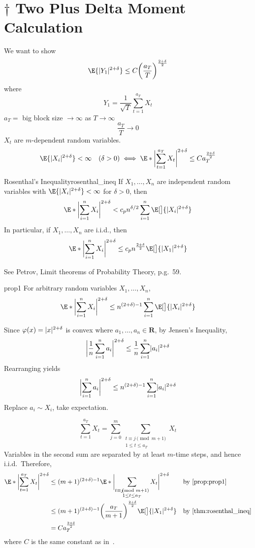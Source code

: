 \section{\texorpdfstring{$ \dagger $}{†} Two Plus Delta Moment Calculation}
We want to show
\[ \E{\abs{Y_1}^{2+\delta}}\le C\biggl(\frac{a_T}{T} \biggr)^{\frac{2+\delta}{2}} \]
where
\[ Y_1=\frac{1}{\sqrt{T}} \sum_{t=1}^{a_T} X_t \]
$ a_T= $ big block size $ \to\infty $ as $ T\to\infty $
\[ \frac{a_T}{T} \to 0 \]
$ X_t $ are $ m $-dependent random variables.
\[ \E{\abs{X_i}^{2+\delta}}<\infty\quad(\delta>0)\iff
    \E*{\abs[\bigg]{\sum_{t=1}^{a_T} X_t}^{2+\delta}}\le C a_T^{\frac{2+\delta}{2}} \]
\begin{Theorem}{Rosenthal's Inequality}{rosenthal_ineq}
    If $ X_1,\ldots,X_n $ are independent random variables
    with $ \E{\abs{X_i}^{2+\delta}}<\infty $ for $ \delta>0 $, then
    \[ \E*{\abs[\bigg]{\sum_{i=1}^{n} X_i}^{2+\delta}}<c_p n^{\delta/2}\sum_{i=1}^{n}
        \E[\big]{\abs{X_i}^{2+\delta}} \]
    In particular, if $ X_1,\ldots,X_n $ are i.i.d., then
    \[ \E*{\abs[\bigg]{\sum_{i=1}^{n} X_i}^{2+\delta}}\le c_p n^{\frac{2+\delta}{2}}
        \E[\big]{\abs{X_1}^{2+\delta}} \]
\end{Theorem}
\begin{Proof}{}{}
    See Petrov, Limit theorems of Probability Theory, p.g.\ 59.
\end{Proof}
\begin{Proposition}{}{prop1}
    For arbitrary random variables $ X_1,\ldots,X_n $,
    \[ \E*{\abs[\bigg]{\sum_{i=1}^{n} X_i}^{2+\delta}}\le n^{(2+\delta)-1}
        \sum_{i=1}^{n}\E[\big]{\abs{X_i}^{2+\delta}} \]
\end{Proposition}
\begin{Proof}{}{}
    Since $ \varphi(x)=\abs{x}^{2+\delta} $ is convex where $ a_1,\ldots,a_n\in\mathbf{R} $,
    by Jensen's Inequality,
    \[ \abs[\bigg]{\frac{1}{n} \sum_{i=1}^{n} a_i}^{2+\delta}\le \frac{1}{n} \sum_{i=1}^{n} \abs{a_i}^{2+\delta} \]
    Rearranging yields
    \[ \abs[\bigg]{\sum_{i=1}^{n} a_i}^{2+\delta}\le
        n^{(2+\delta)-1}\sum_{i=1}^{n} \abs{a_i}^{2+\delta} \]
    Replace $ a_i\sim X_i $, take expectation.
\end{Proof}
\[ \sum_{t=1}^{a_T} X_t=\sum_{j=0}^{m}
    \sum_{\substack{t\equiv j\!\!\!\!\pmod{m+1}\\1\le t\le a_T}}X_t  \]
Variables in the second sum are separated by at least
$ m $-time steps, and hence i.i.d.\ Therefore,
\begin{align*}
    \E*{\abs[\bigg]{\sum_{t=1}^{a_T} X_t}^{2+\delta}}
     & \le (m+1)^{(2+\delta)-1}
    \E*{\abs[\bigg]{\sum_{\substack{t\equiv j\!\!\!\!\pmod{m+1}                                                                                            \\1\le t\le a_T}}X_t}^{2+\delta}} &  & \text{by~\Cref{prop:prop1}}\\
     & \le (m+1)^{(2+\delta)-1}\biggl(\frac{a_T}{m+1} \biggr)^{\frac{2+\delta}{2} }\E[\big]{\abs{X_1}^{2+\delta}} &  & \text{by~\Cref{thm:rosenthal_ineq}} \\
     & =C a_T^{\frac{2+\delta}{2}}
\end{align*}
where $ C $ is the same constant as in~.

